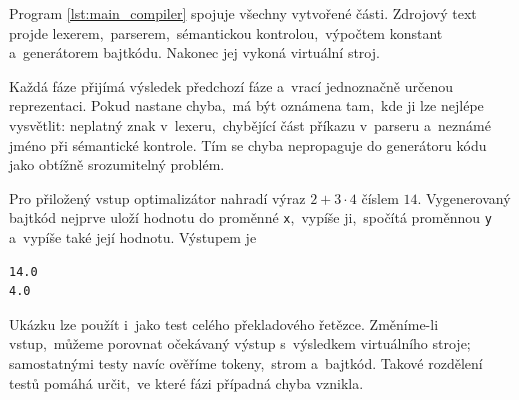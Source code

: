 Program \ref{lst:main_compiler} spojuje všechny vytvořené části. Zdrojový text projde lexerem,~parserem,~sémantickou kontrolou,~výpočtem konstant a~generátorem bajtkódu. Nakonec jej vykoná virtuální stroj.

Každá fáze přijímá výsledek předchozí fáze a~vrací jednoznačně určenou reprezentaci. Pokud nastane chyba,~má být oznámena tam,~kde ji lze nejlépe vysvětlit: neplatný znak v~lexeru,~chybějící část příkazu v~parseru a~neznámé jméno při sémantické kontrole. Tím se chyba nepropaguje do generátoru kódu jako obtížně srozumitelný problém.



Pro přiložený vstup optimalizátor nahradí výraz $2+3\cdot4$ číslem $14$. Vygenerovaný bajtkód nejprve uloží hodnotu do proměnné \texttt{x},~vypíše ji,~spočítá proměnnou \texttt{y} a~vypíše také její hodnotu. Výstupem je
\begin{verbatim}
14.0
4.0
\end{verbatim}

Ukázku lze použít i~jako test celého překladového řetězce. Změníme-li vstup,~můžeme porovnat očekávaný výstup s~výsledkem virtuálního stroje; samostatnými testy navíc ověříme tokeny,~strom a~bajtkód. Takové rozdělení testů pomáhá určit,~ve které fázi případná chyba vznikla.

